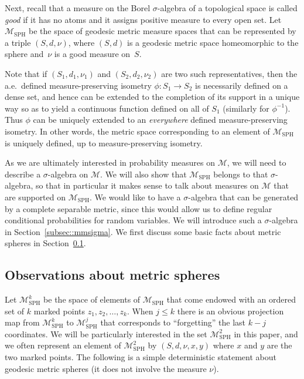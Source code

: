\documentclass[10pt]{amsart}
\let\mathcal\mathscr
\theoremstyle{plain}
\numberwithin{theorem}{section}
\theoremstyle{definition}
\newcommand\gmsspace{{\mathcal M}_{\mathrm{SPH}}}
\newcommand\mmspace{{\mathcal M}}
\begin{document}
Next, recall that a measure on the Borel $\sigma$-algebra of a topological space is called \emph{good} if it has no atoms and it assigns positive measure to every open set. Let~$\gmsspace$ be the space of geodesic metric measure spaces that can be represented by a triple $(S,d,\nu)$, where $(S,d)$ is a geodesic metric space homeomorphic to the sphere and~$\nu$ is a good measure on~$S$.

Note that if $(S_1, d_1, \nu_1)$ and $(S_2, d_2, \nu_2)$ are two such representatives, then the a.e.\ defined measure-preserving isometry $\phi \colon S_1 \to S_2$ is necessarily defined on a dense set, and hence can be extended to the completion of its support in a unique way so as to yield a continuous function defined on all of $S_1$ (similarly for $\phi^{-1}$). Thus $\phi$ can be uniquely extended to an \emph{everywhere} defined measure-preserving isometry. In other words, the metric space corresponding to an element of $\gmsspace$ is uniquely defined, up to measure-preserving isometry.

As we are ultimately interested in probability measures on $\mmspace$, we will need to describe a $\sigma$-algebra on $\mmspace$. We will also show that $\gmsspace$ belongs to that $\sigma$-algebra, so that in particular it makes sense to talk about measures on $\mmspace$ that are supported on $\gmsspace$. We would like to have a $\sigma$-algebra that can be generated by a complete separable metric, since this would allow us to define regular conditional probabilities for random variables. We will introduce such a $\sigma$-algebra in Section~\ref{subsec::mmsigma}. We first discuss some basic facts about metric spheres in Section~\ref{subsec::metricsphereobservations}.

\subsection{Observations about metric spheres}
\label{subsec::metricsphereobservations}

Let $\gmsspace^k$ be the space of elements of $\gmsspace$ that come endowed with an ordered set of $k$ marked points $z_1, z_2, \ldots, z_k$. When $j \leq k$ there is an obvious projection map from $\gmsspace^k$ to $\gmsspace^j$ that corresponds to ``forgetting'' the last $k-j$ coordinates. We will be particularly interested in the set $\gmsspace^2$ in this paper, and we often represent an element of $\gmsspace^2$ by $(S, d, \nu, x,y)$ where $x$ and $y$ are the two marked points. The following is a simple deterministic statement about geodesic metric spheres (\ie it does not involve the measure $\nu$).
\end{document}
